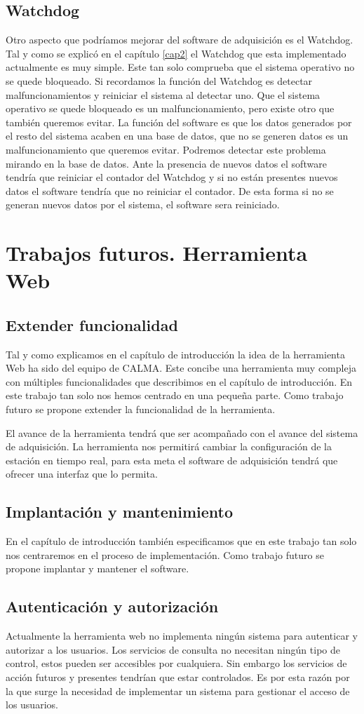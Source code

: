 	\subsection{Watchdog}
	Otro aspecto que podríamos mejorar del software de adquisición es el Watchdog. Tal y como se explicó en el capítulo \ref{cap2} el Watchdog que esta
	implementado actualmente es muy simple. Este tan solo comprueba que el sistema operativo no se quede bloqueado. Si recordamos la función del
	Watchdog es detectar malfuncionamientos y reiniciar el sistema al detectar uno. Que el sistema operativo se quede bloqueado es un
	malfuncionamiento, pero existe otro que también queremos evitar. La función del software es que los datos generados por el resto del sistema
	acaben en una base de datos, que no se generen datos es un malfuncionamiento que queremos evitar. Podremos detectar este problema mirando en
	la base de datos. Ante la presencia de nuevos datos el software tendría que reiniciar el contador del Watchdog y si no están presentes nuevos
	datos el software tendría que no reiniciar el contador. De esta forma si no se generan nuevos datos por el sistema, el software sera
	reiniciado.
\section{Trabajos futuros. Herramienta Web}
	\subsection{Extender funcionalidad}
	Tal y como explicamos en el capítulo de introducción la idea de la herramienta Web ha sido del equipo de CALMA. Este concibe una herramienta
	muy compleja con múltiples funcionalidades que describimos en el capítulo de introducción. En este trabajo tan solo nos hemos centrado en una
	pequeña parte. Como trabajo futuro se propone extender la funcionalidad de la herramienta.
	\par
	El avance de la herramienta tendrá que ser acompañado con el avance del sistema de adquisición. La herramienta nos permitirá cambiar la
	configuración de la estación en tiempo real, para esta meta el software de adquisición tendrá que ofrecer una interfaz que lo permita.
	\subsection{Implantación y mantenimiento}
	En el capítulo de introducción también especificamos que en este trabajo tan solo nos centraremos en el proceso de implementación. Como
	trabajo futuro se propone implantar y mantener el software.
	\subsection{Autenticación y autorización}
	Actualmente la herramienta web no implementa ningún sistema para autenticar y autorizar a los usuarios. Los servicios de consulta no necesitan
	ningún tipo de control, estos pueden ser accesibles por cualquiera. Sin embargo los servicios de acción futuros y presentes tendrían que estar
	controlados. Es por esta razón por la que surge la necesidad de implementar un sistema para gestionar el acceso de los usuarios. 
